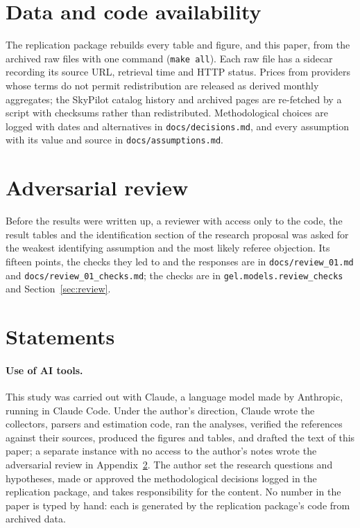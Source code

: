 \section{Data and code availability}
\label{app:replication}

The replication package rebuilds every table and figure, and this paper, from the archived raw
files with one command (\texttt{make all}). Each raw file has a sidecar recording its source URL,
retrieval time and HTTP status. Prices from providers whose terms do not permit redistribution are
released as derived monthly aggregates; the SkyPilot catalog history and archived pages are
re-fetched by a script with checksums rather than redistributed. Methodological choices are logged
with dates and alternatives in \texttt{docs/decisions.md}, and every assumption with its value and
source in \texttt{docs/assumptions.md}.

\section{Adversarial review}
\label{app:review}

Before the results were written up, a reviewer with access only to the code, the result tables
and the identification section of the research proposal was asked for the weakest identifying
assumption and the most likely referee objection. Its fifteen points, the checks they led to and
the responses are in \texttt{docs/review\_01.md} and \texttt{docs/review\_01\_checks.md}; the
checks are in \texttt{gel.models.review\_checks} and Section~\ref{sec:review}.

\section{Statements}
\label{app:statements}

\paragraph{Use of AI tools.} This study was carried out with Claude, a language model made by
Anthropic, running in Claude Code. Under the author's direction, Claude wrote the collectors,
parsers and estimation code, ran the analyses, verified the references against their sources,
produced the figures and tables, and drafted the text of this paper; a separate instance with no
access to the author's notes wrote the adversarial review in Appendix~\ref{app:review}. The author
set the research questions and hypotheses, made or approved the methodological decisions logged
in the replication package, and takes responsibility for the content. No number in the paper is
typed by hand: each is generated by the replication package's code from archived data.

